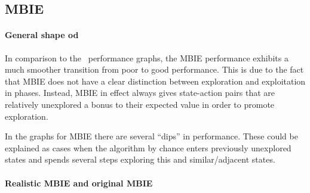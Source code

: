 \subsection{MBIE }
\paragraph{General shape od} In comparison to the \etre\ performance graphs, the MBIE performance exhibits a much smoother transition from poor to good performance. This is due to the fact that MBIE does not have a clear distinction between exploration and exploitation in phases. Instead, MBIE in effect always gives state-action pairs that are relatively unexplored a bonus to their expected value in order to promote exploration.  

In the graphs for MBIE there are several ``dips'' in performance. These could be explained as cases when the algorithm by chance enters previously unexplored states and spends several steps exploring this and similar/adjacent states. 

\paragraph{Realistic MBIE and original MBIE}


